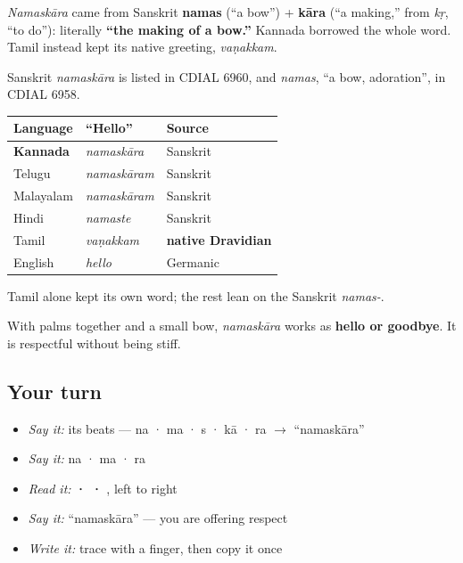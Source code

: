 \begin{cousinweb}
\emph{Namaskāra} came from Sanskrit \textbf{namas} (“a bow”) + \textbf{kāra} (“a making,” from \emph{kṛ}, “to do”): literally \textbf{“the making of a bow.”} Kannada borrowed the whole word. Tamil instead kept its native greeting, \emph{vaṇakkam}.

Sanskrit \emph{namaskāra} is listed in CDIAL 6960, and \emph{namas}, \textquotedblleft{}a bow, adoration\textquotedblright{}, in CDIAL 6958.
\end{cousinweb}

\begin{tcolorbox}[breakable,skin=enhanced,colback=violet!6,colframe=violet!45!black,boxrule=0.5pt,arc=1mm,left=6pt,right=6pt,top=4pt,bottom=4pt,fonttitle=\bfseries,title={Across the family — the same idea, five ways}]
\noindent
\begin{tabularx}{\linewidth}{@{}>{\raggedright\arraybackslash}X>{\raggedright\arraybackslash}X>{\raggedright\arraybackslash}X@{}}
\toprule
\textbf{Language} & \textbf{\textquotedblleft{}Hello\textquotedblright{}} & \textbf{Source} \\
\midrule
\textbf{Kannada} & \emph{namaskāra} & Sanskrit \\
Telugu & \emph{namaskāram} & Sanskrit \\
Malayalam & \emph{namaskāram} & Sanskrit \\
Hindi & \emph{namaste} & Sanskrit \\
Tamil & \emph{vaṇakkam} & \textbf{native Dravidian} \\
English & \emph{hello} & Germanic \\
\bottomrule
\end{tabularx}

Tamil alone kept its own word; the rest lean on the Sanskrit \emph{namas-}.
\end{tcolorbox}

\begin{culture}
With palms together and a small bow, \emph{namaskāra} works as \textbf{hello or goodbye}. It is respectful without being stiff.
\end{culture}

\subsection*{Your turn}
\begin{itemize}
\raggedright
  \item \emph{Say it:} its beats — na · ma · s · kā · ra $\to$ \textquotedblleft{}namaskāra\textquotedblright{}
  \item \emph{Say it:} na · ma · ra
  \item \emph{Read it:} \textbf{ ·  · }, left to right
  \item \emph{Say it:} \textquotedblleft{}namaskāra\textquotedblright{} — you are offering respect
  \item \emph{Write it:} trace \textbf{} with a finger, then copy it once
\end{itemize}

